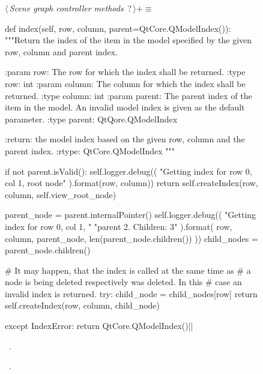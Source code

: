 \documentclass[%
    a4paper,    %
    justified,  %
    nobib,      %
    openany     %
]{tufte-book}
\begin{document}
\begin{figure}
\begin{flushleft} \small
\begin{minipage}{\linewidth}\label{scrap31}\raggedright\small
{} $\langle\,${\itshape Scene graph controller methods}\nobreak\ {\footnotesize {?}}$\,\rangle+\equiv$
\vspace{-1ex}
\begin{pythoncode}
def index(self, row, column, parent=QtCore.QModelIndex()):
"""Return the index of the item in the model specified by the
    given row, column and parent index.

    :param row: The row for which the index shall be returned.
    :type  row: int
    :param column: The column for which the index shall be
                   returned.
    :type column:  int
    :param parent: The parent index of the item in the model. An
                   invalid model index is given as the default
                   parameter.
    :type parent: QtQore.QModelIndex

    :return: the model index based on the given row, column and
             the parent index.
    :rtype: QtCore.QModelIndex
    """

    if not parent.isValid():
        self.logger.debug((
            "Getting index for row {0}, col {1}, root node"
        ).format(row, column))
        return self.createIndex(row, column, self.view_root_node)

    parent_node = parent.internalPointer()
    self.logger.debug((
        "Getting index for row {0}, col {1}, "
        "parent {2}. Children: {3}"
    ).format(
        row, column, parent_node, len(parent_node.children())
    ))
    child_nodes = parent_node.children()

    # It may happen, that the index is called at the same time as
    # a node is being deleted respectively was deleted. In this
    # case an invalid index is returned.
    try:
        child_node  = child_nodes[row]
        return self.createIndex(row, column, child_node)

    except IndexError:
        return QtCore.QModelIndex()|\NWsep|
\end{pythoncode}
\vspace{1.5ex}
\footnotesize
\begin{list}{}{\setlength{\itemsep}{-\parsep}\setlength{\itemindent}{-\leftmargin}}
\item \NWtxtMacroDefBy\ .
\item \NWtxtMacroRefIn\ .


\end{list}
\end{minipage}
\end{flushleft}
\end{figure}
\end{document}
